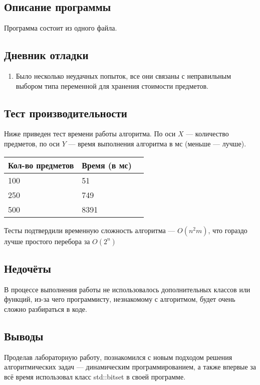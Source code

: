 \documentclass[12pt]{article}
\begin{document}
    \subsection*{Описание программы}

    Программа состоит из одного файла.

    \subsection*{Дневник отладки}

    \begin{enumerate}
    \item Было несколько неудачных попыток, все они связаны с неправильным 
    выбором типа переменной для хранения стоимости предметов. 
    \end{enumerate}


    \subsection*{Тест производительности}

    Ниже приведен тест времени работы алгоритма. По оси $X$ — количество 
    предметов, по оси $Y$ — время выполнения алгоритма в мс (меньше — лучше).
    

    \begin{tabular}{ | l | l | l | }
        \hline
            Кол-во предметов & Время (в мс) \\ \hline
            100              & 51           \\
            250              & 749          \\
            500              & 8391         \\
        \hline
    \end{tabular}

    Тесты подтвердили временную сложность алгоритма — $O(n^2m)$, что гораздо 
    лучше простого перебора за $O(2^n)$

    \subsection*{Недочёты}

    В процессе выполнения работы не использовалось дополнительных классов или 
    функций, из-за чего программисту, незнакомому с алгоритмом, будет очень 
    сложно разбираться в коде.

    \subsection*{Выводы}

    Проделав лабораторную работу, познакомился с новым подходом решения 
    алгоритмических задач — динамическим программированием, а также впервые 
    за всё время использовал класс std::bitset в своей программе.
\end{document}
